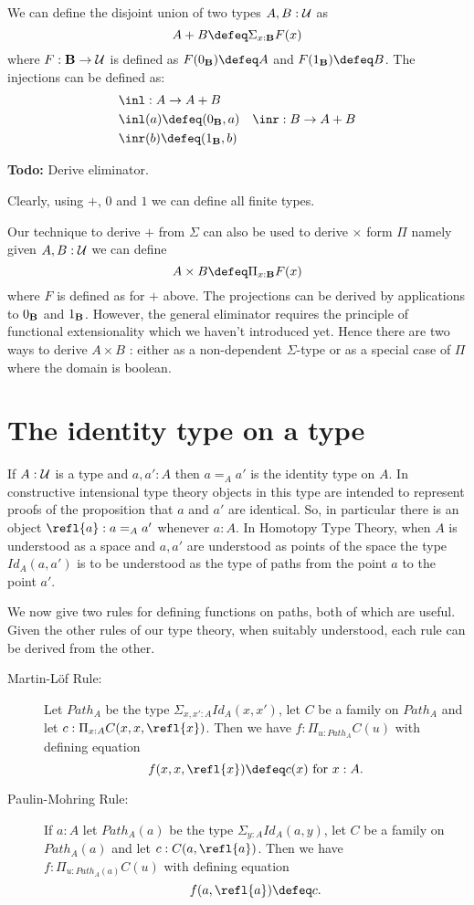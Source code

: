 {We can define the disjoint union of two types $A,B:{\mathcal U}$ as
\[A + B \defeq \Sigma_{x:\bool}F(x)\]
where $F : {\bf B} \to {\mathcal U}$ is
defined as $F(0_\bool) \defeq A$ and $F(1_\bool)\defeq B$. The
injections can be defined as:
\begin{align*}
& \inl :  A \to A+B\\
& \inl(a) \defeq (0_\bool,a)
& \inr :  B \to A+B\\
& \inr(b) \defeq (1_\bool,b)
\end{align*}

\textbf{Todo:} Derive eliminator.

Clearly, using $+$, $0$ and $1$ we can define all finite types.

Our technique to derive $+$ from $\Sigma$ can also be used to derive
$\times$ form $\Pi$ namely given $A,B:{\mathcal U}$ we can define 
\[ A \times B \defeq \Pi_{x:\bool}F(x)\]
where $F$ is defined as for $+$ above. The projections can be derived
by applications to $0_{\bf B}$ and $1_{\bf B}$. However, the general
eliminator requires the principle of functional extensionality which
we haven't introduced yet. Hence there are two ways to derive $A\times
B$ : either as a non-dependent $\Sigma$-type or as a special case of
$\Pi$ where the domain is boolean. 

\section{The identity type on a type}
\label{sec:identity-types}

If $A:{\mathcal U}$ is a type and $a,a':A$ then $a =_A a'$ is the identity type on $A$.  
In constructive intensional type theory objects in this type are
intended to represent proofs of the proposition that $a$ and $a'$ are
identical.  So, in particular there is an object $\refl{a}: a =_A a'$ whenever $a:A$.  In Homotopy Type Theory, when $A$ is understood as a space and $a,a'$ are understood as points of the space the type $Id_A(a,a')$ is to be understood as the type of paths from the point $a$ to the point $a'$.

We now give two rules for defining functions on paths, both of which are useful.  Given the other rules of our type theory, when suitably understood, each rule can be derived from the other. 

\begin{description}
\item[Martin-L\"{o}f Rule:] Let $Path_A$ be the type $\Sigma_{x,x':A}Id_A(x,x')$, let $C$ be a family on $Path_A$ and let $c:\Pi_{x:A}C(x,x,\refl{x})$.  Then we have $f:\Pi_{u:Path_A}C(u)$ with defining equation
  \[ f(x,x,\refl{x})\defeq c(x)\mbox{ for } x:A.\]
\item[Paulin-Mohring Rule:] If $a:A$ let $Path_A(a)$ be the type $\Sigma_{y:A}Id_A(a,y)$, let $C$ be a family on $Path_A(a)$ and let $c:C(a,\refl{a})$. Then we have\\ $f:\Pi_{u:Path_A(a)}C(u)$ with defining equation
    \[ f(a,\refl{a})\defeq c.\]
\end{description}

}
